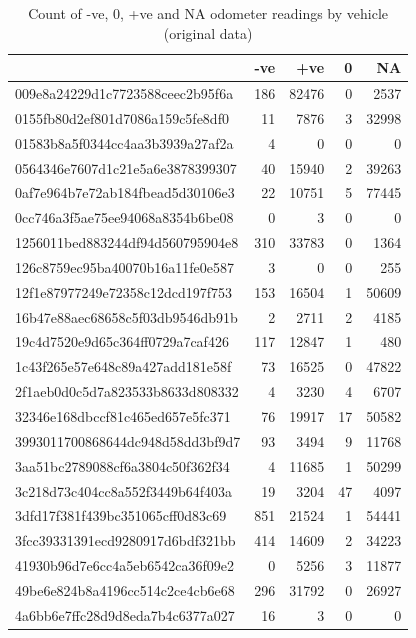 \documentclass[]{article}
\begin{document}
\begin{table}[t]

\caption{\label{tab:checkOdometer}Count of -ve, 0, +ve and NA odometer readings by vehicle (original data)}
\centering
\begin{tabular}{l|r|r|r|r}
\hline
  & -ve & +ve & 0 & NA\\
\hline
009e8a24229d1c7723588ceec2b95f6a & 186 & 82476 & 0 & 2537\\
\hline
0155fb80d2ef801d7086a159c5fe8df0 & 11 & 7876 & 3 & 32998\\
\hline
01583b8a5f0344cc4aa3b3939a27af2a & 4 & 0 & 0 & 0\\
\hline
0564346e7607d1c21e5a6e3878399307 & 40 & 15940 & 2 & 39263\\
\hline
0af7e964b7e72ab184fbead5d30106e3 & 22 & 10751 & 5 & 77445\\
\hline
0cc746a3f5ae75ee94068a8354b6be08 & 0 & 3 & 0 & 0\\
\hline
1256011bed883244df94d560795904e8 & 310 & 33783 & 0 & 1364\\
\hline
126c8759ec95ba40070b16a11fe0e587 & 3 & 0 & 0 & 255\\
\hline
12f1e87977249e72358c12dcd197f753 & 153 & 16504 & 1 & 50609\\
\hline
16b47e88aec68658c5f03db9546db91b & 2 & 2711 & 2 & 4185\\
\hline
19c4d7520e9d65c364ff0729a7caf426 & 117 & 12847 & 1 & 480\\
\hline
1c43f265e57e648c89a427add181e58f & 73 & 16525 & 0 & 47822\\
\hline
2f1aeb0d0c5d7a823533b8633d808332 & 4 & 3230 & 4 & 6707\\
\hline
32346e168dbccf81c465ed657e5fc371 & 76 & 19917 & 17 & 50582\\
\hline
3993011700868644dc948d58dd3bf9d7 & 93 & 3494 & 9 & 11768\\
\hline
3aa51bc2789088cf6a3804c50f362f34 & 4 & 11685 & 1 & 50299\\
\hline
3c218d73c404cc8a552f3449b64f403a & 19 & 3204 & 47 & 4097\\
\hline
3dfd17f381f439bc351065cff0d83c69 & 851 & 21524 & 1 & 54441\\
\hline
3fcc39331391ecd9280917d6bdf321bb & 414 & 14609 & 2 & 34223\\
\hline
41930b96d7e6cc4a5eb6542ca36f09e2 & 0 & 5256 & 3 & 11877\\
\hline
49be6e824b8a4196cc514c2ce4cb6e68 & 296 & 31792 & 0 & 26927\\
\hline
4a6bb6e7ffc28d9d8eda7b4c6377a027 & 16 & 3 & 0 & 0\\

\end{tabular}
\end{table}
\end{document}
